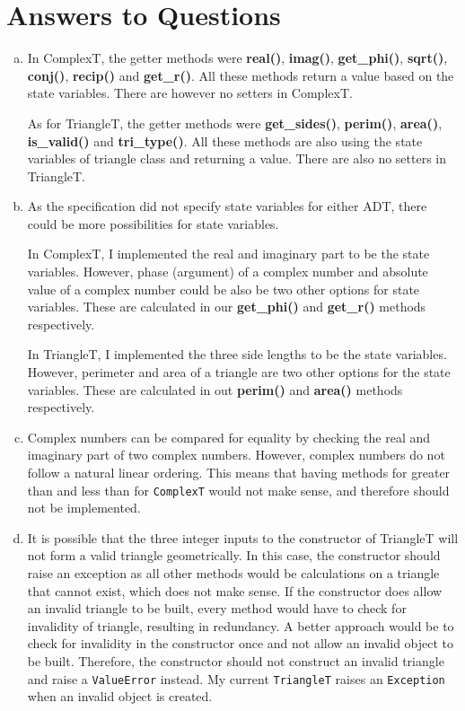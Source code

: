 \documentclass[12pt]{article}
\begin{document}
\section{Answers to Questions}
\begin{enumerate}[(a)]

\item In ComplexT, the getter methods were \textbf{real()}, \textbf{imag()}, \textbf{get\_phi()}, \textbf{sqrt()}, \textbf{conj()}, \textbf{recip()} and \textbf{get\_r()}. All these methods return a value based on the state variables. There are however no setters in ComplexT. 
\par As for TriangleT, the getter methods were \textbf{get\_sides()}, \textbf{perim()}, \textbf{area()}, \textbf{is\_valid()} and \textbf{tri\_type()}. All these methods are also using the state variables of triangle class and returning a value. There are also no setters in TriangleT.
\item As the specification did not specify state variables for either ADT, there could be more possibilities for state variables.
\par In ComplexT, I implemented the real and imaginary part to be the state variables. However, phase (argument) of a complex number and absolute value of a complex number could be also be two other options for state variables. These are calculated in our \textbf{get\_phi()} and \textbf{get\_r()} methods respectively.
\par In TriangleT, I implemented the three side lengths to be the state variables. However, perimeter and area of a triangle are two other options for the state variables. These are calculated in out \textbf{perim()} and \textbf{area()} methods respectively.
\item Complex numbers can be compared for equality by checking the real and imaginary part of two complex numbers. However, complex numbers do not follow a natural linear ordering. This means that having methods for greater than and less than for \verb|ComplexT| would not make sense, and therefore should not be implemented.
\item It is possible that the three integer inputs to the constructor of TriangleT will not form a valid triangle geometrically. In this case, the constructor should raise an exception as all other methods would be calculations on a triangle that cannot exist, which does not make sense. If the constructor does allow an invalid triangle to be built, every method would have to check for invalidity of triangle, resulting in redundancy. A better approach would be to check for invalidity in the constructor once and not allow an invalid object to be built. Therefore, the constructor should not construct an invalid triangle and raise a \verb|ValueError| instead. My current \verb|TriangleT| raises an \verb|Exception| when an invalid object is created. 

\end{enumerate}
\end{document}
